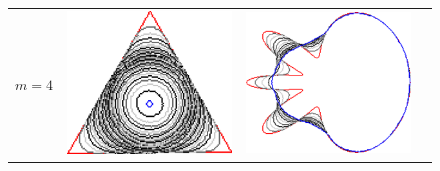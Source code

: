 \begin{figure}
\begin{tabular}{p{3em}ccc}
$m=4$ & \includegraphics[scale=0.25]{figures/chapter6/level-effect/triangle/improve/len_pen0/radius-5/level4/summary.pdf} &
\includegraphics[scale=0.25]{figures/chapter6/level-effect/flower/improve/len_pen0/radius-5/level4/summary.pdf} &

\end{tabular}
\end{figure}
